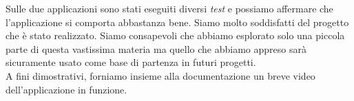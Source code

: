 Sulle due applicazioni sono stati eseguiti diversi \textit{test} e possiamo affermare che l'applicazione si comporta abbastanza bene.
Siamo molto soddisfatti del progetto che è stato realizzato. Siamo consapevoli che abbiamo esplorato solo una piccola parte di questa vastissima materia ma quello che abbiamo appreso sarà sicuramente usato come base di partenza in futuri progetti.\\
\newline
A fini dimostrativi, forniamo insieme alla documentazione un breve video dell'applicazione in funzione.